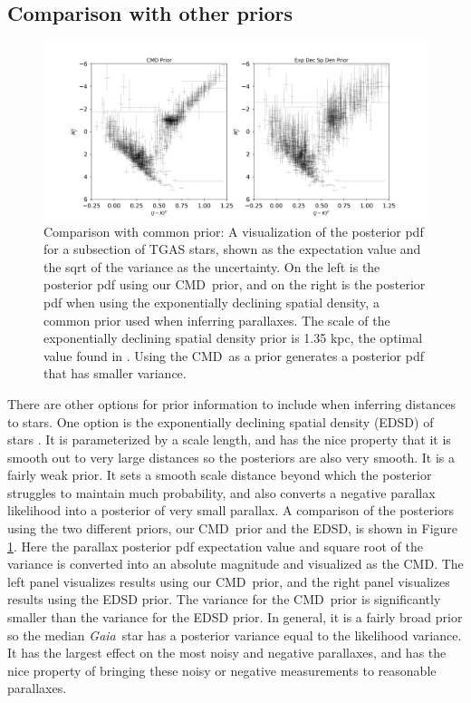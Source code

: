 \documentclass[modern]{aastex61}
\newcommand{\acronym}[1]{{\small{#1}}}
\newcommand{\project}[1]{\textsl{#1}}
\newcommand{\gaia}{\project{Gaia}}
\newcommand{\cmd}{\acronym{CMD}}
\begin{document}
\subsection{Comparison with other priors}
\begin{figure}
\centering
  \includegraphics[width=\textwidth]{comparePrior.png}
\caption{Comparison with common prior: A visualization of the posterior pdf for a subsection of TGAS stars, shown as the expectation value and the sqrt of the variance as the uncertainty. On the left is the posterior pdf using our \cmd\ prior, and on the right is the posterior pdf when using the exponentially declining spatial density, a common prior used when inferring parallaxes. The scale of the exponentially declining spatial density prior is 1.35 kpc, the optimal value found in \cite{astraatmadja16a}. Using the \cmd\ as a prior generates a posterior pdf that has smaller variance.}
\label{fig:comparePrior}
\end{figure}

There are other options for prior information to include when inferring distances to stars.
One option is the exponentially declining spatial density (EDSD) of stars \citep{astraatmadja16a}.
It is parameterized by a scale length, and has the nice property that it is smooth out to very large distances so the posteriors are also very smooth.
It is a fairly weak prior.
It sets a smooth scale distance beyond which the posterior struggles to maintain much probability, and also converts a negative parallax likelihood into a posterior of very small parallax.
A comparison of the posteriors using the two different priors, our \cmd\ prior and the EDSD, is shown in Figure \ref{fig:comparePrior}.
Here the parallax posterior pdf expectation value and square root of the variance is converted into an absolute magnitude and visualized as the \cmd.
The left panel visualizes results using our \cmd\ prior, and the right panel visualizes results using the EDSD prior.
The variance for the \cmd\ prior is significantly smaller than the variance for the EDSD prior.
In general, it is a fairly broad prior so the median \gaia\ star has a posterior variance equal to the likelihood variance.
It has the largest effect on the most noisy and negative parallaxes, and has the nice property of bringing these noisy or negative measurements to reasonable parallaxes.
\end{document}
